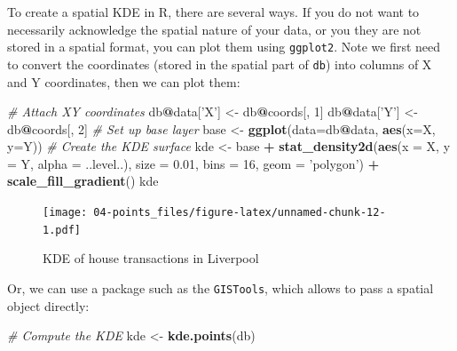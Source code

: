 \documentclass[
]{book}
\newenvironment{Shaded}{\begin{snugshade}}{\end{snugshade}}
\newcommand{\CommentTok}[1]{\textcolor[rgb]{0.56,0.35,0.01}{\textit{#1}}}
\newcommand{\DataTypeTok}[1]{\textcolor[rgb]{0.13,0.29,0.53}{#1}}
\newcommand{\DecValTok}[1]{\textcolor[rgb]{0.00,0.00,0.81}{#1}}
\newcommand{\FloatTok}[1]{\textcolor[rgb]{0.00,0.00,0.81}{#1}}
\newcommand{\KeywordTok}[1]{\textcolor[rgb]{0.13,0.29,0.53}{\textbf{#1}}}
\newcommand{\NormalTok}[1]{#1}
\newcommand{\OperatorTok}[1]{\textcolor[rgb]{0.81,0.36,0.00}{\textbf{#1}}}
\newcommand{\StringTok}[1]{\textcolor[rgb]{0.31,0.60,0.02}{#1}}
\begin{document}
To create a spatial KDE in R, there are several ways. If you do not want to necessarily acknowledge the spatial nature of your data, or you they are not stored in a spatial format, you can plot them using \texttt{ggplot2}. Note we first need to convert the coordinates (stored in the spatial part of \texttt{db}) into columns of X and Y coordinates, then we can plot them:

\begin{Shaded}
\begin{Highlighting}[]
\CommentTok{# Attach XY coordinates}
\NormalTok{db}\OperatorTok{@}\NormalTok{data[}\StringTok{'X'}\NormalTok{] <-}\StringTok{ }\NormalTok{db}\OperatorTok{@}\NormalTok{coords[, }\DecValTok{1}\NormalTok{]}
\NormalTok{db}\OperatorTok{@}\NormalTok{data[}\StringTok{'Y'}\NormalTok{] <-}\StringTok{ }\NormalTok{db}\OperatorTok{@}\NormalTok{coords[, }\DecValTok{2}\NormalTok{]}
\CommentTok{# Set up base layer}
\NormalTok{base <-}\StringTok{ }\KeywordTok{ggplot}\NormalTok{(}\DataTypeTok{data=}\NormalTok{db}\OperatorTok{@}\NormalTok{data, }\KeywordTok{aes}\NormalTok{(}\DataTypeTok{x=}\NormalTok{X, }\DataTypeTok{y=}\NormalTok{Y))}
\CommentTok{# Create the KDE surface}
\NormalTok{kde <-}\StringTok{ }\NormalTok{base }\OperatorTok{+}\StringTok{ }\KeywordTok{stat_density2d}\NormalTok{(}\KeywordTok{aes}\NormalTok{(}\DataTypeTok{x =}\NormalTok{ X, }\DataTypeTok{y =}\NormalTok{ Y, }\DataTypeTok{alpha =}\NormalTok{ ..level..), }
               \DataTypeTok{size =} \FloatTok{0.01}\NormalTok{, }\DataTypeTok{bins =} \DecValTok{16}\NormalTok{, }\DataTypeTok{geom =} \StringTok{'polygon'}\NormalTok{) }\OperatorTok{+}
\StringTok{            }\KeywordTok{scale_fill_gradient}\NormalTok{()}
\NormalTok{kde}
\end{Highlighting}
\end{Shaded}

\begin{figure}
\centering
\texttt{[image: 04-points\_files/figure-latex/unnamed-chunk-12-1.pdf]}
\caption{\label{fig:unnamed-chunk-12}KDE of house transactions in Liverpool}
\end{figure}

Or, we can use a package such as the \texttt{GISTools}, which allows to pass a spatial object directly:

\begin{Shaded}
\begin{Highlighting}[]
\CommentTok{# Compute the KDE}
\NormalTok{kde <-}\StringTok{ }\KeywordTok{kde.points}\NormalTok{(db)}
\end{Highlighting}
\end{Shaded}
\end{document}
